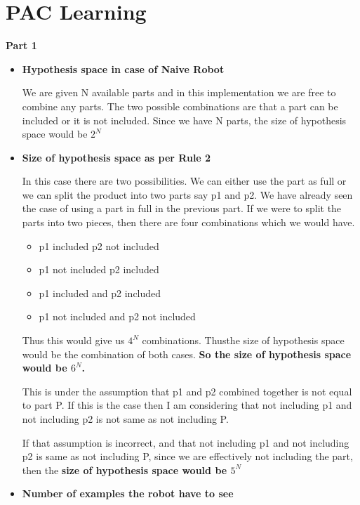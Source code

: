 \documentclass[12pt, fullpage,letterpaper]{article}
\begin{document}
\section{PAC Learning}	

\textbf{Part 1 }

\begin{itemize}
	\item  \textbf{Hypothesis space in case of Naive Robot} 
	
	We are given N available parts and in this implementation we are free to combine any parts. The two possible combinations are that a part can be included or it is not  included. Since we have N parts, the size of hypothesis space would be \underline{$2^N$}
	
	\item \textbf{Size of hypothesis space as per Rule 2}
	
	In this case there are two possibilities. We can either use the part as full or we can split the product into two parts say p1 and p2. We have already seen the case of using a part in full in the previous part. If we were to split the parts into two pieces, then there are four combinations which we would have.
	
	\begin{itemize}
		\item p1 included p2 not included
		\item p1 not included p2 included
		\item p1 included and p2 included
		\item p1 not included and p2 not included
	\end{itemize}
	
	Thus this would give us $4^N$ combinations. Thusthe size of hypothesis space would be the combination of both cases. \textbf{So the size of hypothesis space would be $6^N$.} 
	
	This is under the assumption that p1 and p2 combined together is not equal to part P. If this is the case then I am considering that not including p1 and not including p2 is not same as not including P.
	
	If that assumption is incorrect, and that not including p1 and not including p2 is same as not including P, since we are effectively not including the part, then the \textbf{size of hypothesis  space would be $5^N $}
	
	\item \textbf{Number of examples the robot have to see}
	

\end{itemize}
\end{document}
